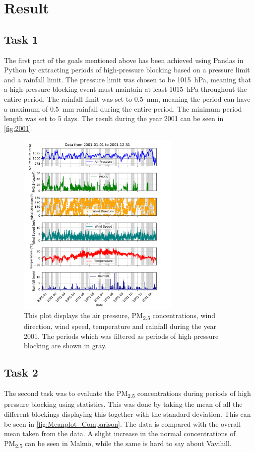 \section{Result}

\subsection{Task 1 }
The first part of the goals mentioned above has been achieved using Pandas in Python by extracting periods of high-pressure blocking based on a pressure limit and a rainfall limit. The pressure limit was chosen to be \SI{1015}{\hecto\pascal}, meaning that a high-pressure blocking event must maintain at least \SI{1015}{\hecto\pascal} throughout the entire period. The rainfall limit was set to \SI{0.5}{\milli\meter}, meaning the period can have a maximum of \SI{0.5}{\milli\meter} rainfall during the entire period. The minimum period length was set to 5 days. The result during the year 2001 can be seen in \autoref{fig:2001}.

\begin{figure}[H]
    \centering    \includegraphics[width=0.7\textwidth]{Figures/plot_20010101_20011231.pdf}
    \caption{This plot displays the air pressure, PM\textsubscript{2.5} concentrations, wind direction, wind speed, temperature and rainfall during the year 2001. The periods which was filtered as periods of high pressure blocking are shown in gray. }
    \label{fig:2001}
\end{figure}

\subsection{Task 2}
The second task was to evaluate the PM\textsubscript{2.5} concentrations during periods of high pressure blocking using statistics. This was done by taking the mean of all the different blockings displaying this together with the standard deviation. This can be seen in \autoref{fig:Meanplot_Comparison}. The data is compared with the overall mean taken from the data. A slight increase in the normal concentrations of PM\textsubscript{2.5} can be seen in Malmö, while the same is hard to say about Vavihill. 





